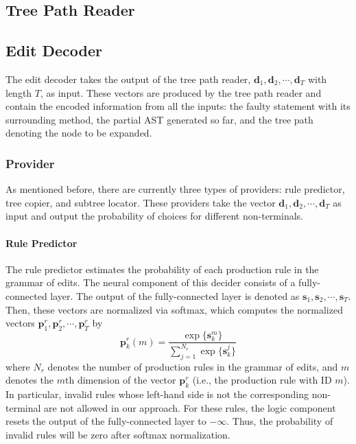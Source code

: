 \subsection{Tree Path Reader}
\subsection{Edit Decoder}
The edit decoder takes the output of the tree path reader, $\bm{d}_1, \bm{d}_2,\cdots{}, \bm{d}_T$ with length $T$, as input. These vectors are produced by the tree path reader and contain the encoded information from all the inputs: the faulty statement with its surrounding method, the partial AST generated so far, and the tree path denoting the node to be expanded.

\subsubsection{Provider}
As mentioned before, there are currently three types of providers: rule predictor, tree copier, and subtree locator. These providers take the vector $\bm{d}_1, \bm{d}_2,\cdots{}, \bm{d}_T$ as input and output the probability of choices for different non-terminals.
\paragraph{\textbf{Rule Predictor}}
 The rule predictor estimates the probability of each production rule in the grammar of edits. The neural component of this decider consists of a fully-connected layer. The output of the fully-connected layer is denoted as $\bm{s}_1, \bm{s}_2, \cdots{}, \bm{s}_T$. Then, these vectors are normalized via softmax, which computes the normalized vectors $\bm p_1^r, \bm p_2^r,\cdots{}, \bm p_T^r$ by
\begin{equation}
    \bm p^r_k(m) = \frac{\exp\{\bm{s}^m_k\}}{\sum_{j=1}^{N_r}\exp\{\bm{s}_k^j\}}
    \label{con:soft}
\end{equation}
where $N_r$ denotes the number of production rules in the grammar of edits, and $m$ denotes the $m$th dimension of the vector $\bm p^r_k$ (i.e., the production rule with ID $m$). 
In particular, invalid rules whose left-hand side is not the corresponding non-terminal are not allowed in our approach. For these rules, the logic component resets the output of the fully-connected layer to $-\infty$. Thus, the probability of invalid rules will be zero after softmax normalization. 

